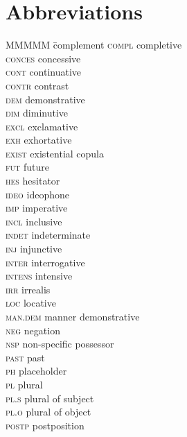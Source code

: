\documentclass[output=paper]{langscibook}
\begin{document}
\section*{Abbreviations}
\begin{multicols}{2}
\begin{tabbing}
MMMMM \= complement\kill
\textsc{compl} \> completive\\            
\textsc{conces} \> concessive\\            
\textsc{cont}  \> continuative \\          
\textsc{contr}  \> contrast     \\         
\textsc{dem}  \> demonstrative  \\        
\textsc{dim}  \> diminutive      \\        
\textsc{excl}  \> exclamative    \\        
\textsc{exh} \> exhortative       \\       
\textsc{exist} \> existential copula  \\   
\textsc{fut}  \> future              \\    
\textsc{hes} \> hesitator       \\         
\textsc{ideo}  \> ideophone     \\         
\textsc{imp}  \> imperative     \\         
\textsc{incl} \> inclusive      \\         
\textsc{indet} \> indeterminate  \\        
\textsc{inj} \> injunctive       \\        
\textsc{inter}  \> interrogative  \\       
\textsc{intens}  \> intensive    \\        
\textsc{irr} \> irrealis   \\              
\textsc{loc} \> locative \\
\textsc{man.dem} \> manner demonstrative\\
\textsc{neg}  \> negation\\
\textsc{nsp} \> non-specific possessor\\
\textsc{past} \> past\\
\textsc{ph} \> placeholder\\
\textsc{pl}  \> plural\\
\textsc{pl.s}  \> plural of subject\\
\textsc{pl.o} \> plural of object\\
\textsc{postp}  \> postposition\\

\end{tabbing}
\end{multicols}
\end{document}
